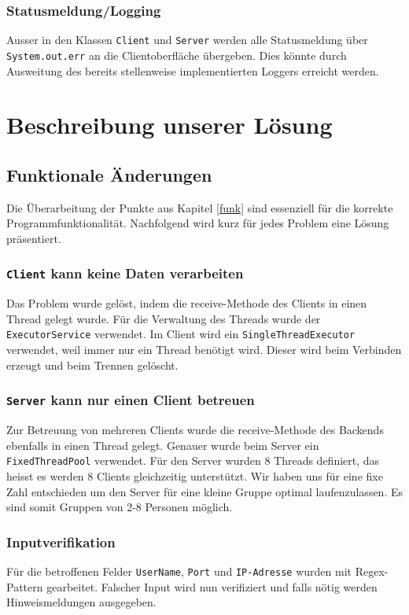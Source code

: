 \documentclass[10pt, hyperref, a4paper]{article}
\begin{document}
\subsubsection{Statusmeldung/Logging}
Ausser in den Klassen \texttt{Client} und \texttt{Server} werden alle Statusmeldung über \texttt{System.out.err} an die Clientoberfläche übergeben. Dies könnte durch Ausweitung des bereits stellenweise implementierten Loggers erreicht werden.




\section{Beschreibung unserer Lösung}

\subsection{Funktionale Änderungen}
Die Überarbeitung der Punkte aus Kapitel \ref{funk} sind essenziell für die korrekte Programmfunktionalität. Nachfolgend wird kurz für jedes Problem eine Lösung präsentiert. 

\subsubsection{\texttt{Client} kann keine Daten verarbeiten}
Das Problem wurde gelöst, indem die receive-Methode des Clients in einen Thread gelegt wurde. Für die Verwaltung des Threads wurde der \texttt{ExecutorService} verwendet. Im Client wird ein \texttt{SingleThreadExecutor} verwendet, weil immer nur ein Thread benötigt wird. Dieser wird beim Verbinden erzeugt und beim Trennen gelöscht. 

\subsubsection{\texttt{Server} kann nur einen Client betreuen}
Zur Betreuung von mehreren Clients wurde die receive-Methode des Backends ebenfalls in einen Thread gelegt. Genauer wurde beim Server ein \texttt{FixedThreadPool} verwendet. Für den Server wurden 8 Threads definiert, das heisst es werden 8 Clients gleichzeitig unterstützt. Wir haben uns für eine fixe Zahl entschieden um den Server für eine kleine Gruppe optimal laufenzulassen. Es sind somit Gruppen von 2-8 Personen möglich.

\subsubsection{Inputverifikation}
Für die betroffenen Felder \texttt{UserName}, \texttt{Port} und \texttt{IP-Adresse} wurden mit Regex-Pattern gearbeitet. Falscher Input wird nun verifiziert und falls nötig werden Hinweismeldungen ausgegeben.
\end{document}
